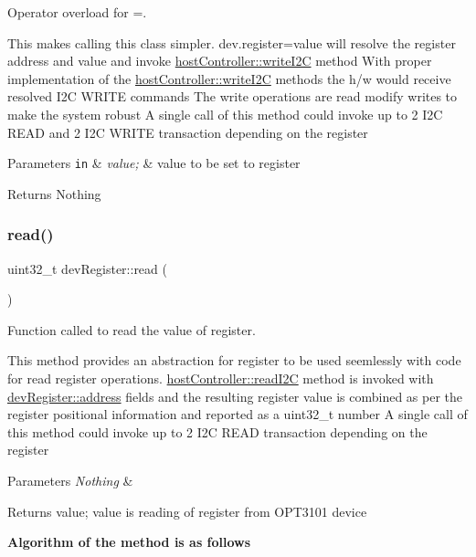 Operator overload for \textquotesingle{}=\textquotesingle{}. 

This makes calling this class simpler. dev.\+register=value will resolve the register address and value and invoke \mbox{\hyperlink{classhost_controller_a7c4126810a72333e3ebe749159a0a516}{host\+Controller\+::write\+I2C}} method With proper implementation of the \mbox{\hyperlink{classhost_controller_a7c4126810a72333e3ebe749159a0a516}{host\+Controller\+::write\+I2C}} methods the h/w would receive resolved I2C W\+R\+I\+TE commands The write operations are read modify writes to make the system robust A single call of this method could invoke up to 2 I2C R\+E\+AD and 2 I2C W\+R\+I\+TE transaction depending on the register 
\begin{DoxyParams}[1]{Parameters}
\mbox{\tt in}  & {\em value;} & value to be set to register \\
\hline
\end{DoxyParams}
\begin{DoxyReturn}{Returns}
Nothing 
\end{DoxyReturn}
\mbox{\label{classdev_register_ac7f2e7ec834102cdf3ebd3a6f849612a}} 
\subsubsection{\texorpdfstring{read()}{read()}}
{\footnotesize\ttfamily uint32\+\_\+t dev\+Register\+::read (\begin{DoxyParamCaption}{ }\end{DoxyParamCaption})}



Function called to read the value of register. 

This method provides an abstraction for register to be used seemlessly with code for read register operations. \mbox{\hyperlink{classhost_controller_a2bee6b3ec45fac241484f7dad943d8ed}{host\+Controller\+::read\+I2C}} method is invoked with \mbox{\hyperlink{classdev_register_ad16fbe9cd26ba1e6d823141976f756da}{dev\+Register\+::address}} fields and the resulting register value is combined as per the register positional information and reported as a uint32\+\_\+t number A single call of this method could invoke up to 2 I2C R\+E\+AD transaction depending on the register 
\begin{DoxyParams}{Parameters}
{\em Nothing} & \\
\hline
\end{DoxyParams}
\begin{DoxyReturn}{Returns}
value; value is reading of register from O\+P\+T3101 device 
\end{DoxyReturn}
{\bfseries Algorithm of the method is as follows}


